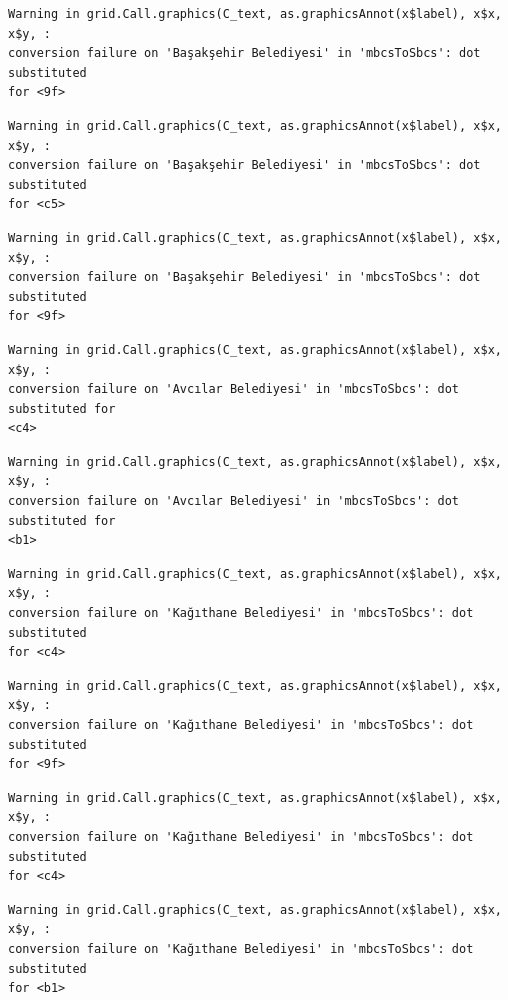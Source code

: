 \documentclass[
  11pt,
  a4paper,
  DIV=11,
  numbers=noendperiod]{scrartcl}
\begin{document}
\begin{verbatim}
Warning in grid.Call.graphics(C_text, as.graphicsAnnot(x$label), x$x, x$y, :
conversion failure on 'Başakşehir Belediyesi' in 'mbcsToSbcs': dot substituted
for <9f>
\end{verbatim}

\begin{verbatim}
Warning in grid.Call.graphics(C_text, as.graphicsAnnot(x$label), x$x, x$y, :
conversion failure on 'Başakşehir Belediyesi' in 'mbcsToSbcs': dot substituted
for <c5>
\end{verbatim}

\begin{verbatim}
Warning in grid.Call.graphics(C_text, as.graphicsAnnot(x$label), x$x, x$y, :
conversion failure on 'Başakşehir Belediyesi' in 'mbcsToSbcs': dot substituted
for <9f>
\end{verbatim}

\begin{verbatim}
Warning in grid.Call.graphics(C_text, as.graphicsAnnot(x$label), x$x, x$y, :
conversion failure on 'Avcılar Belediyesi' in 'mbcsToSbcs': dot substituted for
<c4>
\end{verbatim}

\begin{verbatim}
Warning in grid.Call.graphics(C_text, as.graphicsAnnot(x$label), x$x, x$y, :
conversion failure on 'Avcılar Belediyesi' in 'mbcsToSbcs': dot substituted for
<b1>
\end{verbatim}

\begin{verbatim}
Warning in grid.Call.graphics(C_text, as.graphicsAnnot(x$label), x$x, x$y, :
conversion failure on 'Kağıthane Belediyesi' in 'mbcsToSbcs': dot substituted
for <c4>
\end{verbatim}

\begin{verbatim}
Warning in grid.Call.graphics(C_text, as.graphicsAnnot(x$label), x$x, x$y, :
conversion failure on 'Kağıthane Belediyesi' in 'mbcsToSbcs': dot substituted
for <9f>
\end{verbatim}

\begin{verbatim}
Warning in grid.Call.graphics(C_text, as.graphicsAnnot(x$label), x$x, x$y, :
conversion failure on 'Kağıthane Belediyesi' in 'mbcsToSbcs': dot substituted
for <c4>
\end{verbatim}

\begin{verbatim}
Warning in grid.Call.graphics(C_text, as.graphicsAnnot(x$label), x$x, x$y, :
conversion failure on 'Kağıthane Belediyesi' in 'mbcsToSbcs': dot substituted
for <b1>
\end{verbatim}
\end{document}
